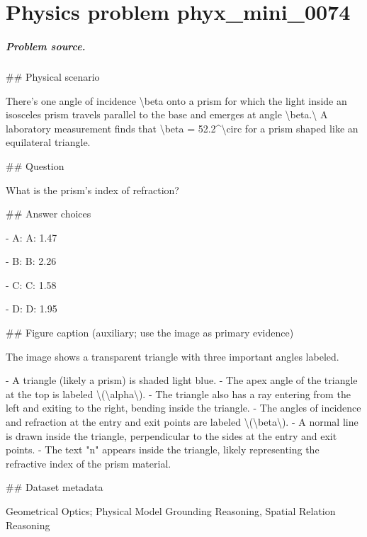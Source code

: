 
\chapter{Physics problem phyx\_mini\_0074}
\label{ch:PhyXMiniProblems_problem_phyx_mini_0074}

\paragraph{Problem source.}
\#\# Physical scenario

There’s one angle of incidence \textbackslash{}beta onto a prism for which the light inside an isosceles prism travels parallel to the base and emerges at angle \textbackslash{}beta.\textbackslash{} A laboratory measurement finds that \textbackslash{}beta = 52.2\textasciicircum{}\textbackslash{}circ for a prism shaped like an equilateral triangle.

\#\# Question

What is the prism’s index of refraction?

\#\# Answer choices

- A: A: 1.47

- B: B: 2.26

- C: C: 1.58

- D: D: 1.95

\#\# Figure caption (auxiliary; use the image as primary evidence)

The image shows a transparent triangle with three important angles labeled. 

- A triangle (likely a prism) is shaded light blue.
- The apex angle of the triangle at the top is labeled \textbackslash{}(\textbackslash{}alpha\textbackslash{}).
- The triangle also has a ray entering from the left and exiting to the right, bending inside the triangle.
- The angles of incidence and refraction at the entry and exit points are labeled \textbackslash{}(\textbackslash{}beta\textbackslash{}).
- A normal line is drawn inside the triangle, perpendicular to the sides at the entry and exit points.
- The text "n" appears inside the triangle, likely representing the refractive index of the prism material.

\#\# Dataset metadata

Geometrical Optics; Physical Model Grounding Reasoning, Spatial Relation Reasoning

